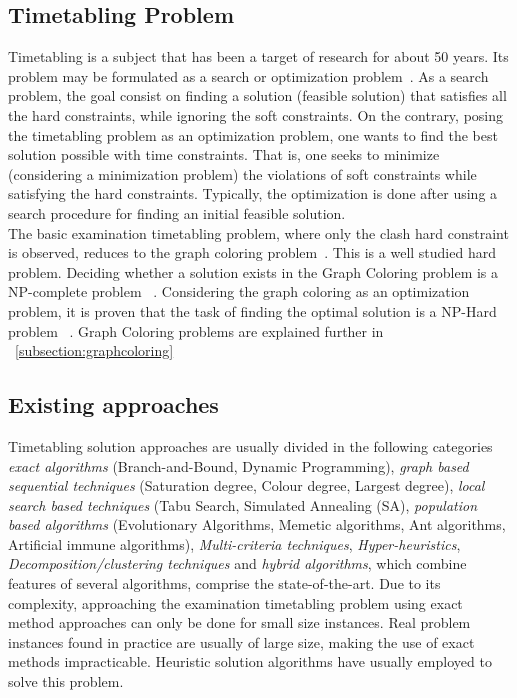 \subsection{Timetabling Problem}
Timetabling is a subject that has been a target of research for about 50 years. Its problem may be formulated as a search or optimization problem~\cite{Schaerf1999}. As a search problem, the goal consist on finding a solution (feasible solution) that satisfies all the hard constraints, while ignoring the soft constraints. On the contrary, posing the timetabling problem as an optimization problem, one wants to find the best solution possible with time constraints. That is, one seeks to minimize (considering a minimization problem) the violations of soft constraints while satisfying the hard
constraints. Typically, the optimization is done after using a search procedure for finding an initial feasible solution.
\\
The basic examination timetabling problem, where only the clash hard constraint is observed, reduces to the graph coloring problem~\cite{Jensen2001}. This is a well studied hard problem. Deciding whether a solution exists in the Graph Coloring problem is a NP-complete problem ~\cite{Arora2009}. Considering the graph coloring as an optimization problem, it is proven that the task of finding the optimal solution is a NP-Hard problem ~\cite{Arora2009}. Graph Coloring problems are explained further in ~\ref{subsection:graphcoloring}
\\
\subsection{Existing approaches}
\label{subsection:ExistingAppr}
Timetabling solution approaches are usually divided in the following categories ~\cite{Qu2009} \textit{exact algorithms} (Branch-and-Bound, Dynamic Programming), \textit{graph based sequential techniques} (Saturation degree, Colour degree, Largest degree), \textit{local search based techniques} (Tabu Search, Simulated Annealing (SA), \textit{population based algorithms} (Evolutionary Algorithms, Memetic algorithms, Ant algorithms, Artificial immune algorithms), \textit{Multi-criteria techniques}, \textit{Hyper-heuristics}, \textit{Decomposition/clustering techniques} and \textit{hybrid algorithms}, which combine features of several algorithms, comprise the state-of-the-art. Due to its complexity, approaching the examination timetabling problem using exact method approaches can only be done for small size instances. Real problem instances found in practice are usually of large size, making the use of exact methods impracticable. Heuristic solution algorithms have usually employed to solve this problem.

